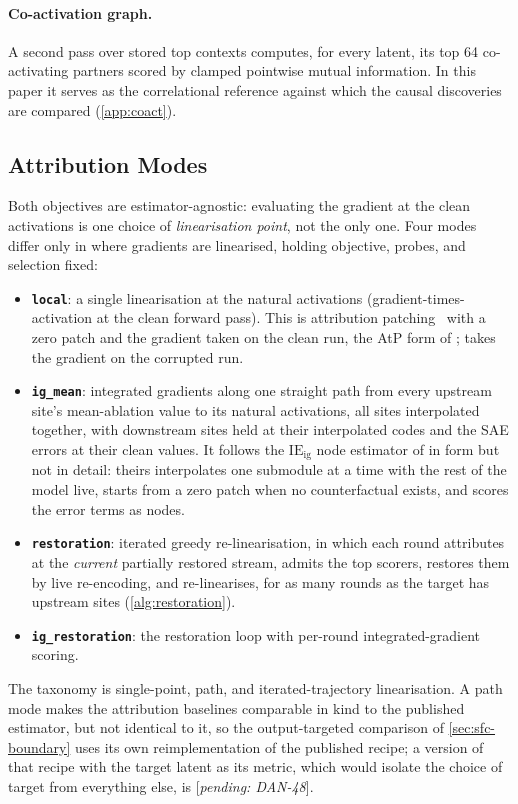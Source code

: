 \documentclass[10pt]{article}
\newcommand{\pending}[1]{\textcolor{red!70!black}{[\textit{pending: #1}]}}
\begin{document}
\paragraph{Co-activation graph.}
A second pass over stored top contexts computes, for every latent, its top 64 co-activating partners scored by clamped pointwise mutual information.
In this paper it serves as the correlational reference against which the causal discoveries are compared (\cref{app:coact}).

\subsection{Attribution Modes}
\label{sec:modes}

Both objectives are estimator-agnostic: evaluating the gradient at the clean activations is one choice of \emph{linearisation point}, not the only one.
Four modes differ only in where gradients are linearised, holding objective, probes, and selection fixed:
\begin{itemize}
\item \textbf{\texttt{local}}: a single linearisation at the natural activations (gradient-times-activation at the clean forward pass). This is attribution patching~\citep{nanda2023attribution, syed2023attribution} with a zero patch and the gradient taken on the clean run, the AtP form of \citet{kramar2024atp}; \citet{nanda2023attribution} takes the gradient on the corrupted run.
\item \textbf{\texttt{ig\_mean}}: integrated gradients along one straight path from every upstream site's mean-ablation value to its natural activations, all sites interpolated together, with downstream sites held at their interpolated codes and the SAE errors at their clean values. It follows the $\mathrm{IE}_{\mathrm{ig}}$ node estimator of \citet{marks2025sparse} in form but not in detail: theirs interpolates one submodule at a time with the rest of the model live, starts from a zero patch when no counterfactual exists, and scores the error terms as nodes.
\item \textbf{\texttt{restoration}}: iterated greedy re-linearisation, in which each round attributes at the \emph{current} partially restored stream, admits the top scorers, restores them by live re-encoding, and re-linearises, for as many rounds as the target has upstream sites (\cref{alg:restoration}).
\item \textbf{\texttt{ig\_restoration}}: the restoration loop with per-round integrated-gradient scoring.
\end{itemize}
The taxonomy is single-point, path, and iterated-trajectory linearisation.
A path mode makes the attribution baselines comparable in kind to the published estimator, but not identical to it, so the output-targeted comparison of \cref{sec:sfc-boundary} uses its own reimplementation of the published recipe; a version of that recipe with the target latent as its metric, which would isolate the choice of target from everything else, is \pending{DAN-48}.
\end{document}
